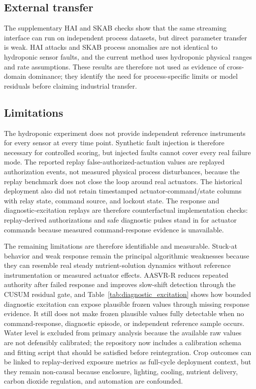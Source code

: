 \documentclass[preprint,12pt,doubleblind]{elsarticle}
\begin{document}
\subsection{External transfer}
The supplementary HAI and SKAB checks show that the same streaming interface can run on independent process datasets, but direct parameter transfer is weak. HAI attacks and SKAB process anomalies are not identical to hydroponic sensor faults, and the current method uses hydroponic physical ranges and rate assumptions. These results are therefore not used as evidence of cross-domain dominance; they identify the need for process-specific limits or model residuals before claiming industrial transfer.

\subsection{Limitations}
The hydroponic experiment does not provide independent reference instruments for every sensor at every time point. Synthetic fault injection is therefore necessary for controlled scoring, but injected faults cannot cover every real failure mode. The reported replay false-authorized-actuation values are replayed authorization events, not measured physical process disturbances, because the replay benchmark does not close the loop around real actuators. The historical deployment also did not retain timestamped actuator-command/state columns with relay state, command source, and lockout state. The response and diagnostic-excitation replays are therefore counterfactual implementation checks: replay-derived authorizations and safe diagnostic pulses stand in for actuator commands because measured command-response evidence is unavailable.

The remaining limitations are therefore identifiable and measurable. Stuck-at behavior and weak response remain the principal algorithmic weaknesses because they can resemble real steady nutrient-solution dynamics without reference instrumentation or measured actuator effects. AASVR-R reduces repeated authority after failed response and improves slow-shift detection through the CUSUM residual gate, and Table~\ref{tab:diagnostic_excitation} shows how bounded diagnostic excitation can expose plausible frozen values through missing response evidence. It still does not make frozen plausible values fully detectable when no command-response, diagnostic episode, or independent reference sample occurs. Water level is excluded from primary analysis because the available raw values are not defensibly calibrated; the repository now includes a calibration schema and fitting script that should be satisfied before reintegration. Crop outcomes can be linked to replay-derived exposure metrics as full-cycle deployment context, but they remain non-causal because enclosure, lighting, cooling, nutrient delivery, carbon dioxide regulation, and automation are confounded.
\end{document}
